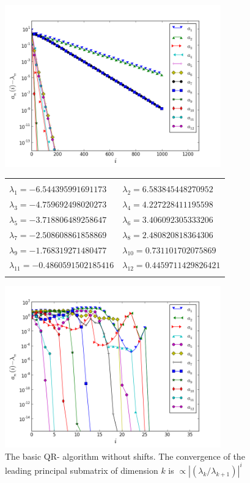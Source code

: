 \begin{figure}%
\begin{center}
\includegraphics[height=7cm]{12x12randn_eigv_conv_QRstandard.png}
	\begin{scriptsize}
	\begin{tabular}{ll}
		\hline
		\hline
		\\
		$\lambda_1=
		-6.544395991691173
		$ & $\lambda_2=
		6.583845448270952
		$ \\ $\lambda_3=
		-4.759692498020273
		$ & $\lambda_4=
		4.227228411195598
		$ \\ $\lambda_5=
		-3.718806489258647
		$ & $\lambda_6=
		3.406092305333206
		$ \\ $\lambda_7=
		-2.508608861858869
		$ & $\lambda_8=
		2.480820818364306
		$ \\ $\lambda_9=
		-1.768319271480477
		$ & $\lambda_{10}=
		0.731101702075869
		$ \\ $\lambda_{11}=
		-0.4860591502185416
		$ & $\lambda_{12}=
		0.4459711429826421
		$ \\
		\\
		\hline
		\hline
	\end{tabular}
	\end{scriptsize}
\caption{
	The basic QR- algorithm without shifts. The convergence of the leading principal submatrix
	of dimension $k$ is $\propto |(\lambda_k/\lambda_{k+1})|^i$
}
\includegraphics[height=7cm]{12x12randn_eigv_conv_QRfull.png}

\end{center}
\end{figure}
